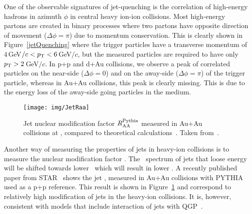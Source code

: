 One of the observable signatures of jet-quenching is the correlation of high-energy hadrons in azimuth $\phi$ in central heavy ion-ion collisions. Most high-energy partons are created in binary processes where two partons have opposite direction of movement ($\Delta\phi = \pi$) due to momentum conservation. This is clearly shown in Figure~\ref{jetQuenching} where the trigger particles have a transverse momentum of $4\,$GeV$/c < {p_{\mathrm{T}}} < 6\,$GeV$/c$, but the measured particles are required to have only ${p_{\mathrm{T}}} > 2\,$GeV$/c$\@. In p+p and d+Au collisions, we observe a peak of correlated particles on the near-side ($\Delta \phi = 0$) and on the away-side ($\Delta \phi = \pi$) of the trigger particle, whereas in Au+Au collisions, this peak is clearly missing. This is due to the energy loss of the away-side going particles in the medium.


\begin{figure}[!htb]
\centering
\texttt{[image: img/JetRaa]}
\caption[Jet nuclear modification factor $\Raa^\mathrm{Pythia}$ measured in Au+Au collisions at \snnFull.]{\label{jetRaa}Jet nuclear modification factor $\Raa^\mathrm{Pythia}$ measured in Au+Au collisions at \snnFull, compared to theoretical calculations~\cite{JetRaaNLOinitialState, JetRaaSCET1,JetRaaSCET2, JetRaaHybrid,JetRaaLBT1, JetRaaLBT2}. Taken from~\cite{RusyPaper}\@.}

\end{figure}

Another way of measuring the properties of jets in heavy-ion collisions is to measure the nuclear modification factor \Raa\@. The \pt\ spectrum of jets that loose energy will be shifted towards lower \pt\ which will result in lower \Raa\@. A recently published paper from STAR~\cite{RusyPaper} shows the jet \Raa, measured in Au+Au collisions with PYTHIA~\cite{PYTHIA} used as a p+p reference. This result is shown in Figure~\ref{jetRaa} and correspond to relatively high modification of jets in the heavy-ion collisions. It is, however, consistent with models that include interaction of jets with QGP~\cite{JetRaaNLOinitialState, JetRaaSCET1,JetRaaSCET2, JetRaaHybrid,JetRaaLBT1, JetRaaLBT2}\@.
